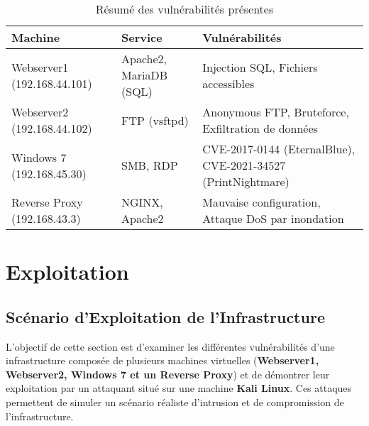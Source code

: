 \documentclass[a4paper,12pt]{report}
\begin{document}
\begin{table}[H]
    \centering
    \begin{tabularx}{\textwidth}{|X|X|X|}
        \hline
        \textbf{Machine} & \textbf{Service} & \textbf{Vulnérabilités} \\
        \hline
        Webserver1 (192.168.44.101) & Apache2, MariaDB (SQL) & Injection SQL, Fichiers accessibles \\
        Webserver2 (192.168.44.102) & FTP (vsftpd) & Anonymous FTP, Bruteforce, Exfiltration de données \\
        Windows 7 (192.168.45.30) & SMB, RDP & CVE-2017-0144 (EternalBlue), CVE-2021-34527 (PrintNightmare) \\
        Reverse Proxy (192.168.43.3) & NGINX, Apache2 & Mauvaise configuration, Attaque DoS par inondation \\
        \hline
    \end{tabularx}
    \caption{Résumé des vulnérabilités présentes}
\end{table}


\chapter{Exploitation}

\section{Scénario d'Exploitation de l'Infrastructure}

L'objectif de cette section est d'examiner les différentes vulnérabilités d'une infrastructure composée de plusieurs machines virtuelles (\textbf{Webserver1, Webserver2, Windows 7 et un Reverse Proxy}) et de démontrer leur exploitation par un attaquant situé sur une machine \textbf{Kali Linux}. Ces attaques permettent de simuler un scénario réaliste d'intrusion et de compromission de l'infrastructure.
\end{document}
